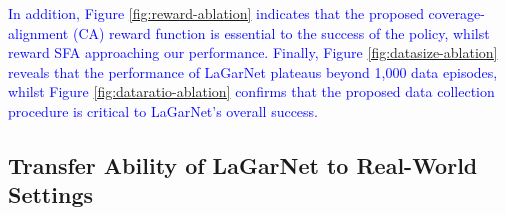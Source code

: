 \documentclass[journal]{IEEEtran}
\newcommand{\addadvantage}[1]{\textcolor{blue}{#1}}
\begin{document}
\addadvantage{In addition, Figure \ref{fig:reward-ablation} indicates that the proposed coverage-alignment (CA) reward function is essential to the success of the policy, whilst reward SFA approaching our performance. Finally, Figure \ref{fig:datasize-ablation} reveals that the performance of LaGarNet plateaus beyond 1,000 data episodes, whilst Figure \ref{fig:dataratio-ablation} confirms that the proposed data collection procedure is critical to LaGarNet's overall success.}


\subsection{Transfer Ability of LaGarNet to Real-World Settings} \label{sec:real-exp}

\begin{table}[t!]
\caption{Real-world garment flattening performance of different pick-and-place controllers. Mesh-based planning method, VCD \cite{lin2020softgym} , reports to reach \colorbox{yellow!25}{79.2 $\pm$ 9.4 \% NI} and \colorbox{yellow!25}{77.3 $\pm$ 14.1 \% NC} for real T-shirt flattening within 20 steps; its improved successor, MEDOR, reports to achieve around \colorbox{gray!25}{64\% NI} flattening for real trousers and \colorbox{gray!25}{46.8\% NI} for real dresses within 10 steps. LaGarNet shows substantial performance improvements across all garments compared to PlaNet-ClothPick, though it still falls short of human-level performance.}
\label{tab:real-worldflattening}
\centering
{}
\end{table}
\end{document}
